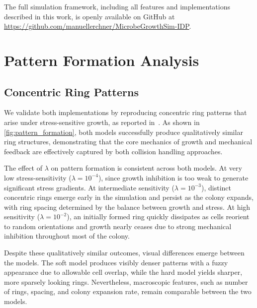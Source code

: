 \documentclass[conference]{IEEEtran}
\begin{document}
The full simulation framework, including all features and implementations described in this work, is openly available on GitHub at \url{https://github.com/manuellerchner/MicrobeGrowthSim-IDP}.

\newpage

\section{Pattern Formation Analysis}

\subsection{Concentric Ring Patterns}

We validate both implementations by reproducing concentric ring patterns that arise under stress-sensitive growth, as reported in~\cite{Weady2024}. As shown in \autoref{fig:pattern_formation}, both models successfully produce qualitatively similar ring structures, demonstrating that the core mechanics of growth and mechanical feedback are effectively captured by both collision handling approaches.

The effect of $\lambda$ on pattern formation is consistent across both models. At very low stress-sensitivity ($\lambda = 10^{-4}$), since growth inhibition is too weak to generate significant stress gradients. At intermediate sensitivity ($\lambda = 10^{-3}$), distinct concentric rings emerge early in the simulation and persist as the colony expands, with ring spacing determined by the balance between growth and stress. At high sensitivity ($\lambda = 10^{-2}$), an initially formed ring quickly dissipates as cells reorient to random orientations and growth nearly ceases due to strong mechanical inhibition throughout most of the colony.

Despite these qualitatively similar outcomes, visual differences emerge between the models. The soft model produces visibly denser patterns with a fuzzy appearance due to allowable cell overlap, while the hard model yields sharper, more sparsely looking rings. Nevertheless, macroscopic features, such as number of rings, spacing, and colony expansion rate, remain comparable between the two models.
\end{document}
